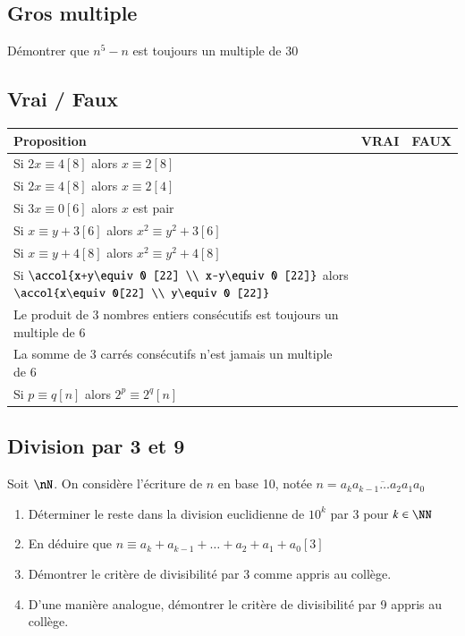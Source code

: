 \documentclass[oneside,12pt]{article}          %
\begin{document}
\subsection{Gros multiple}
Démontrer que $n^5-n$ est toujours un multiple de 30



\subsection{Vrai / Faux}
\begin{center}
\renewcommand{\arraystretch}{1.7}
\begin{tabular}{|p{}|p{1.5cm}|p{1.5cm}|} \hline
    \centering Proposition & VRAI & FAUX \\ \hline
    \centering Si $2x\equiv4 [8]$ alors $x\equiv2 [8]$ & & \\ \hline
    \centering Si $2x\equiv4 [8]$ alors $x\equiv2 [4]$ & & \\ \hline
    \centering Si $3x\equiv0 [6]$ alors $x$ est pair & & \\ \hline
    \centering Si $x\equiv y+3 [6]$ alors $x^2\equiv y^2+3 [6]$ & & \\ \hline
    \centering Si $x\equiv y+4 [8]$ alors $x^2\equiv y^2+4 [8]$ & & \\ \hline
    \centering Si $\accol{x+y\equiv 0 [22] \\ x-y\equiv 0 [22]}$ alors $\accol{x\equiv0[22] \\ y\equiv0 [22]}$ & & \\ \hline
    \centering Le produit de 3 nombres entiers consécutifs est toujours un multiple de 6 & & \\ \hline
    \centering La somme de 3 carrés consécutifs n'est jamais un multiple de 6 & & \\ \hline
    \centering Si $p\equiv q[n]$ alors $2^p\equiv 2^q[n]$ & & \\ \hline
\end{tabular}
\end{center}



\subsection{Division par 3 et 9}
Soit $\nN$. On considère l'écriture de $n$ en base 10, notée $n=\overline{a_ka_{k-1}\ldots a_2a_1a_0}$
\begin{enumerate}
    \item Déterminer le reste dans la division euclidienne de $10^k$ par 3 pour $k\in\NN$
    \item En déduire que $n\equiv a_k+a_{k-1}+\ldots+a_2+a_1+a_0 [3]$
    \item Démontrer le critère de divisibilité par 3 comme appris au collège.
    \item D'une manière analogue, démontrer le critère de divisibilité par 9 appris au collège.
\end{enumerate}
\end{document}
